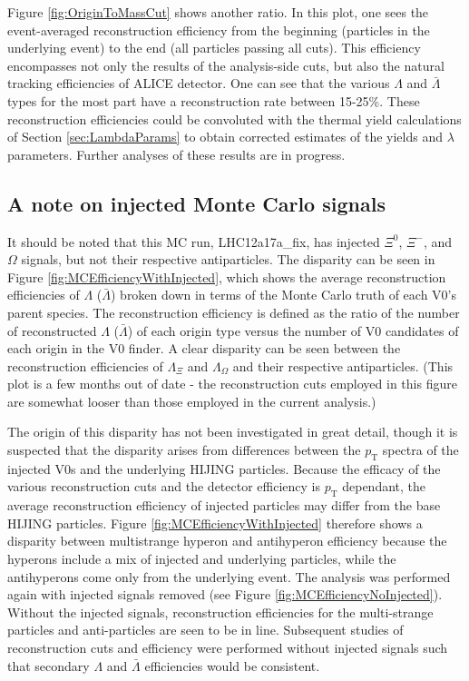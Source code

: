 Figure \ref{fig:OriginToMassCut} shows another ratio.  In this plot, one sees the event-averaged reconstruction efficiency from the beginning (particles in the underlying event) to the end (all particles passing all cuts).  This efficiency encompasses not only the results of the analysis-side cuts, but also the natural tracking efficiencies of ALICE detector.  One can see that the various $\Lambda$ and $\bar{\Lambda}$ types for the most part have a reconstruction rate between 15-25\%.  These reconstruction efficiencies could be convoluted with the thermal yield calculations of Section \ref{sec:LambdaParams} to obtain corrected estimates of the yields and $\lambda$ parameters.  Further analyses of these results are in progress.

\subsection{A note on injected Monte Carlo signals}
\label{sec:ReconstructionEff}

It should be noted that this MC run, LHC12a17a\_fix, has injected $\Xi^0$, $\Xi^-$, and $\Omega$ signals, but not their respective antiparticles.  The disparity can be seen in Figure \ref{fig:MCEfficiencyWithInjected}, which shows the average reconstruction efficiencies of $\Lambda$ ($\bar{\Lambda}$) broken down in terms of the Monte Carlo truth of each V0's parent species. The reconstruction efficiency is defined as the ratio of the number of reconstructed $\Lambda$ ($\bar{\Lambda}$) of each origin type versus the number of V0 candidates of each origin in the V0 finder.  A clear disparity can be seen between the reconstruction efficiencies of $\Lambda_{\Xi}$ and $\Lambda_{\Omega}$ and their respective antiparticles.  (This plot is a few months out of date - the reconstruction cuts employed in this figure are somewhat looser than those employed in the current analysis.)

The origin of this disparity has not been investigated in great detail, though it is suspected that the disparity arises from differences between the $p_\mathrm{T}$ spectra of the injected V0s and the 
underlying HIJING particles.  Because the efficacy of the various reconstruction cuts and the detector efficiency is $p_\mathrm{T}$ dependant, the average reconstruction efficiency of injected particles may differ from the base HIJING particles.  Figure \ref{fig:MCEfficiencyWithInjected} therefore shows a disparity between multistrange hyperon and antihyperon efficiency because the hyperons include a mix of injected and underlying particles, while the antihyperons come only from the underlying event. The analysis was performed again with injected signals removed (see Figure \ref{fig:MCEfficiencyNoInjected}).  Without the injected signals, reconstruction efficiencies for the multi-strange particles and anti-particles are seen to be in line.  Subsequent studies of reconstruction cuts and efficiency were performed without injected signals such that secondary $\Lambda$ and $\bar{\Lambda}$ efficiencies would be consistent.

